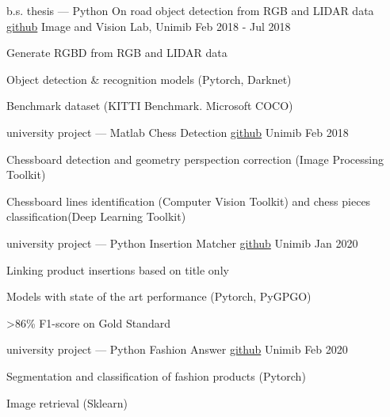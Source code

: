 

\begin{cventries}

  \cventry
    {b.s. thesis --- Python} %
    {On road object detection from RGB and LIDAR data \tiny \href{https://github.com/gianscarpe/bachelor_thesis}{github}} %
    {Image and Vision Lab, Unimib} %
    {Feb 2018 - Jul 2018} %
    {
      \begin{cvitems} %
		\item Generate RGBD from RGB and LIDAR data
		\item Object detection \& recognition models (Pytorch, Darknet)
		\item Benchmark dataset (KITTI Benchmark. Microsoft COCO)
      \end{cvitems}
    }


\cventry
{university project --- Matlab}
{Chess Detection \tiny \href{https://github.com/gianscarpe/chess_detection}{github}}
{Unimib}
{Feb 2018}
{
	\begin{cvitems} %
		\item Chessboard detection and geometry perspection correction (Image Processing Toolkit)
		\item Chessboard lines identification (Computer Vision Toolkit) and chess pieces classification(Deep Learning Toolkit)
	\end{cvitems}
}


\cventry
{university project --- Python}
{Insertion Matcher \tiny \href{https://github.com/belerico/insertion-matcher}{github}}
{Unimib}
{Jan 2020}
{
	\begin{cvitems} %
		\item Linking product insertions based on title only
		\item Models with state of the art performance  (Pytorch, PyGPGO)
		\item >86\% F1-score on Gold Standard
	\end{cvitems}
}


\cventry
{university project --- Python}
{Fashion Answer \tiny \href{https://github.com/gianscarpe/fashion-answer}{github}}
{Unimib}
{Feb 2020}
{
	\begin{cvitems} %
		\item Segmentation and classification of fashion products (Pytorch)
		\item Image retrieval (Sklearn)
	\end{cvitems}
}

    
\end{cventries}


